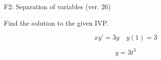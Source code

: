 \begin{exercise}
  \begin{exerciseTitle}F2: Separation of variables (ver. 26)\end{exerciseTitle}
  \begin{exerciseStatement}
    
Find the solution to the given IVP.

    
\[xy'= 3 y \hspace{1em} y( 1 ) = 3\]

  \end{exerciseStatement}
  \begin{exerciseAnswer}
    
\[y= 3 t^ 3\]

  \end{exerciseAnswer}
\end{exercise}